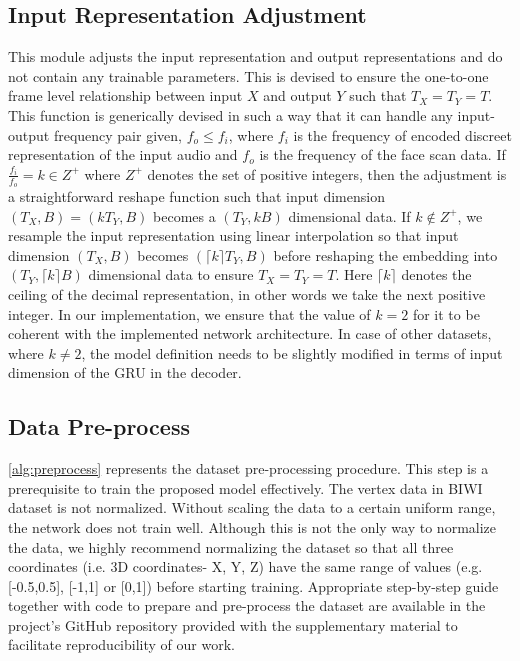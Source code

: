 \documentclass[10pt,twocolumn,letterpaper]{article}
\begin{document}
\subsection{Input Representation Adjustment}
This module adjusts the input representation and output representations and do not contain any trainable parameters. This is devised to ensure the one-to-one frame level relationship between input $X$ and output $Y$ such that $T_X = T_Y = T$. This function is generically devised in such a way that it can handle any input-output frequency pair given, $f_{o}\leq f_{i}$, where $f_{i}$ is the frequency of encoded discreet representation of the input audio and $f_{o}$ is the frequency of the face scan data. If $\frac{f_{i}}{f_{o}}=k \in Z^+$ where $Z^+$ denotes the set of positive integers, then the adjustment is a straightforward reshape function such that input dimension $(T_X,B) = (kT_Y,B)$ becomes a $(T_Y,kB)$ dimensional data. If $k \notin Z^+$, we resample the input representation using linear interpolation so that input dimension $(T_X,B)$ becomes $(\lceil k \rceil T_Y,B)$ before reshaping the embedding into $(T_Y,\lceil k \rceil B)$ dimensional data to ensure $T_X= T_Y = T$. Here $\lceil k \rceil$ denotes the ceiling of the decimal representation, in other words we take the next positive integer. In our implementation, we ensure that the value of $k = 2$ for it to be coherent with the implemented network architecture. In case of other datasets, where $k\neq2$, the model definition needs to be slightly modified in terms of input dimension of the GRU in the decoder. 


\subsection{Data Pre-process}
\cref{alg:preprocess} represents the dataset pre-processing procedure. This step is a prerequisite to train the proposed model effectively. The vertex data in BIWI dataset is not normalized. Without scaling the data to a certain uniform range, the network does not train well. Although this is not the only way to normalize the data, we highly recommend normalizing the dataset so that all three coordinates (i.e. 3D coordinates- X, Y, Z) have the same range of values (e.g. [-0.5,0.5], [-1,1] or [0,1]) before starting training. Appropriate step-by-step guide together with code to prepare and pre-process the dataset are available in the project's GitHub repository provided with the supplementary material to facilitate reproducibility of our work.   
\end{document}
